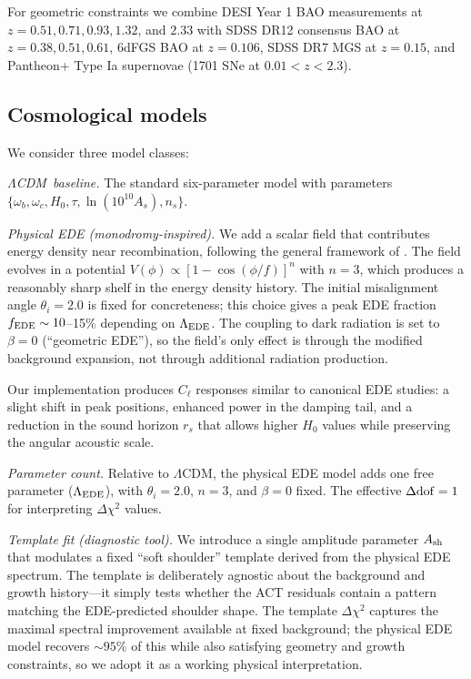 \documentclass[onecolumn,showpacs,preprintnumbers,amsmath,amssymb,prd]{revtex4-2}
\newcommand{\lcdm}{$\Lambda$CDM}
\begin{document}
For geometric constraints we combine DESI Year 1 BAO measurements at $z = 0.51, 0.71, 0.93, 1.32$, and $2.33$ with SDSS DR12 consensus BAO at $z = 0.38, 0.51, 0.61$, 6dFGS BAO at $z = 0.106$, SDSS DR7 MGS at $z = 0.15$, and Pantheon+ Type Ia supernovae (1701 SNe at $0.01 < z < 2.3$).

\subsection{Cosmological models}

We consider three model classes:

\emph{\lcdm\ baseline.} The standard six-parameter model with parameters 
$\{\omega_b, \omega_c, H_0, \tau, \ln(10^{10}A_s), n_s\}$.

\emph{Physical EDE (monodromy-inspired).} We add a scalar field that contributes 
energy density near recombination, following the general framework of 
\cite{Poulin2019,Smith2020}. The field evolves in a potential $V(\phi) \propto 
[1 - \cos(\phi/f)]^n$ with $n = 3$, which produces a reasonably sharp shelf in 
the energy density history. The initial misalignment angle $\theta_i = 2.0$ is 
fixed for concreteness; this choice gives a peak EDE fraction $f_{\rm EDE} 
\sim 10$--15\% depending on $\Lambda_{\rm EDE}$. The coupling to dark radiation 
is set to $\beta = 0$ (``geometric EDE''), so the field's only effect is through 
the modified background expansion, not through additional radiation production.

Our implementation produces $C_\ell$ responses similar to canonical EDE studies: 
a slight shift in peak positions, enhanced power in the damping tail, and a 
reduction in the sound horizon $r_s$ that allows higher $H_0$ values while 
preserving the angular acoustic scale.

\emph{Parameter count.} Relative to \lcdm, the physical EDE model adds one 
free parameter ($\Lambda_{\rm EDE}$), with $\theta_i = 2.0$, $n = 3$, and 
$\beta = 0$ fixed. The effective $\Delta{\rm dof} = 1$ for interpreting 
$\Delta\chi^2$ values.

\emph{Template fit (diagnostic tool).} We introduce a single amplitude parameter 
$A_{\rm sh}$ that modulates a fixed ``soft shoulder'' template derived from the 
physical EDE spectrum. The template is deliberately agnostic about the background 
and growth history---it simply tests whether the ACT residuals contain a pattern 
matching the EDE-predicted shoulder shape. The template $\Delta\chi^2$ captures 
the maximal spectral improvement available at fixed background; the physical EDE 
model recovers $\sim 95\%$ of this while also satisfying geometry and growth 
constraints, so we adopt it as a working physical interpretation.
\end{document}
